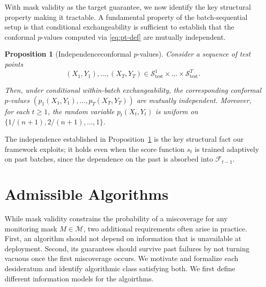 \documentclass{uai2026} %
\newtheorem{proposition}[theorem]{Proposition}
\newcommand{\1}{\mathbf{1}}
\newcommand{\test}{\mathrm{test}}
\newcommand{\scal}{\mathcal{S}}
\newcommand{\F}{\mathcal{F}}
\newcommand{\mcal}{\mathcal{M}}
\newcommand{\scaltest}{\scal_{\test}}
\begin{document}
With mask validity as the target guarantee, we now identify the key structural property making it tractable. A fundamental property of the batch-sequential setup is that conditional exchangeability is sufficient to establish that the conformal $p$-values computed via \eqref{eq:pt-def} are mutually independent.

\begin{proposition}[Independenceconformal $p$-values]
  \label{prop:iid-pvalues} Consider a sequence of test points $$(X_1,Y_1), \ldots, (X_T,Y_T) \in  \scaltest^1\times \ldots\times \scaltest^T.$$

  Then, under conditional within-batch exchangeability, the corresponding conformal $p$-values $(p_1(X_1,Y_1), \ldots, p_T(X_T, Y_T))$ are mutually independent.
  Moreover, for each $t\ge 1$, the random variable $p_t(X_t, Y_t)$ is uniform on $\{1/(n+1),2/(n+1),\ldots,1\}$.
\end{proposition}

The independence established in Proposition~\ref{prop:iid-pvalues} is the key structural fact our framework exploits; it holds even when the score function $s_t$ is trained adaptively on past batches, since the dependence on the past is absorbed into $\F_{t-1}$.





\section{Admissible Algorithms}
\label{sec:admissible}
\label{sec:beyond}

While mask validity constrains the probability of a miscoverage for any monitoring mask $M\in\mcal$, two additional requirements often arise in practice.
First, an algorithm should not depend on information that is unavailable at deployment.
Second, its guarantees should survive past failures by not turning vacuous once the first miscoverage occurs. We motivate and formalize each desideratum and identify algorithmic class satisfying both. We first define different information models for the algoirthms.
\end{document}
